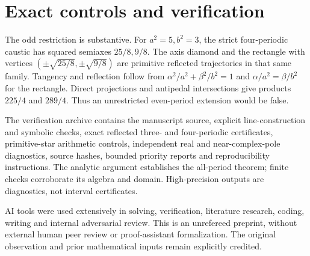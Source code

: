 \documentclass[11pt,letterpaper]{article}
\begin{document}
\section{Exact controls and verification}
The odd restriction is substantive. For $a^2=5,b^2=3$, the strict
four-periodic caustic has squared semiaxes $25/8,9/8$.
The axis diamond and the rectangle with vertices
$(\pm\sqrt{25/8},\pm\sqrt{9/8})$ are primitive reflected trajectories
in that same family. Tangency and reflection follow from
$\alpha^2/a^2+\beta^2/b^2=1$ and
$\alpha/a^2=\beta/b^2$ for the rectangle. Direct projections and
antipedal intersections give products $225/4$ and $289/4$.
Thus an unrestricted even-period extension would be false.

The verification archive contains the manuscript source, explicit
line-construction and symbolic checks, exact reflected three- and
four-periodic certificates, primitive-star arithmetic controls,
independent real and near-complex-pole diagnostics, source hashes,
bounded priority reports and reproducibility instructions.
The analytic argument establishes the all-period theorem; finite
checks corroborate its algebra and domain. High-precision outputs
are diagnostics, not interval certificates.

AI tools were used extensively in solving, verification, literature
research, coding, writing and internal adversarial review.
This is an unrefereed preprint, without external human peer review
or proof-assistant formalization. The original observation and
prior mathematical inputs remain explicitly credited.
\end{document}

